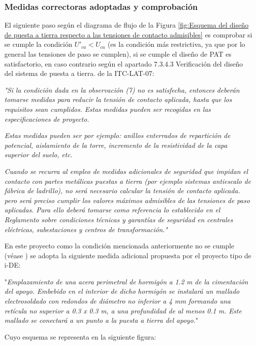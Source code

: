 \subsubsection{Medidas correctoras adoptadas y comprobación}
\label{subsubsec:apoyosF-medidasAdoptadas-pat}
El siguiente paso según el diagrama de flujo de la Figura \ref{fig:Esquema del diseño de puesta a tierra respecto a las tensiones de contacto admisibles} es comprobar si se cumple la condición $U'_{ca}<U_{ca}$ (es la condición más restrictiva, ya que por lo general las tensiones de paso se cumplen), si se cumple el diseño de \ac{PAT} es satisfactorio, en caso contrario según el apartado 7.3.4.3 Verificación del diseño del sistema de puesta a tierra. de la ITC-LAT-07:

\textit{"Si la condición dada en la observación (7) no es satisfecha, entonces deberán tomarse medidas para reducir la tensión de contacto aplicada, hasta que los  requisitos sean cumplidos. Estas medidas pueden ser recogidas en las especificaciones de proyecto.} 

\textit{Estas medidas pueden ser por ejemplo: anillos enterrados de repartición de potencial, aislamiento de la torre, incremento de la resistividad de la capa superior del suelo, etc.} 

\textit{Cuando se recurra al empleo de medidas adicionales de seguridad que impidan el contacto con partes metálicas puestas a tierra (por ejemplo sistemas antiescalo de fábrica de ladrillo), no será necesario calcular la tensión de contacto aplicada. pero será preciso cumplir los valores máximos admisibles de las tensiones de paso aplicadas. Para ello deberá tomarse como referencia lo establecido en el Reglamento sobre condiciones técnicas y garantías de seguridad en centrales eléctricas, subestaciones y centros de transformación."}

En este proyecto como la condición mencionada anteriormente no se cumple (véase ) se adopta la siguiente medida adicional propuesta por el proyecto tipo de \ac{i-DE}:

"\textit{Emplazamiento de una acera perimetral de hormigón a 1.2 m de la cimentación del apoyo. Embebido en el interior de dicho hormigón se instalará un mallado electrosoldado con redondos de diámetro no inferior a 4 mm formando una retícula no superior a 0.3 x 0.3 m, a una profundidad de al menos 0.1 m. Este mallado se conectará a un punto a la puesta a tierra del apoyo.}"

Cuyo esquema se representa en la siguiente figura:

